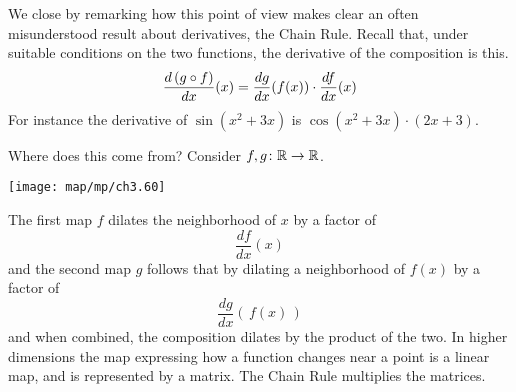 We close by remarking how
this point of view makes clear an often misunderstood  
result about derivatives, the Chain Rule.
Recall that, under suitable conditions on the two functions,
the derivative of the composition is this.
\begin{equation*}
  \frac{d\,(g\mathbin{\circ} f)}{dx}(x) = 
  \frac{dg}{dx}(f(x))\cdot\frac{df}{dx}(x)
\end{equation*} 
For instance the derivative of $\sin(x^2+3x)$ is
$\cos(x^2+3x)\cdot(2x+3)$.

Where does this come from?
Consider $\mbox{$f,g\colon \mathbb{R}\to \mathbb{R}$}$. 
\begin{center}
  \texttt{[image: map/mp/ch3.60]}
\end{center}
The first map $f$ dilates the neighborhood of $x$ by a factor of 
\begin{equation*}
  \frac{df}{dx}(x) 
\end{equation*}
and the second map $g$ follows that by dilating 
a neighborhood of $f(x)$ by a factor of 
\begin{equation*}
  \frac{dg}{dx}(\,f(x)\,) 
\end{equation*}
and when combined, 
the composition dilates by the product of the two.
In higher dimensions 
the map expressing how a function changes near a point is a linear map,
and is represented by a matrix.
The Chain Rule multiplies the matrices.


